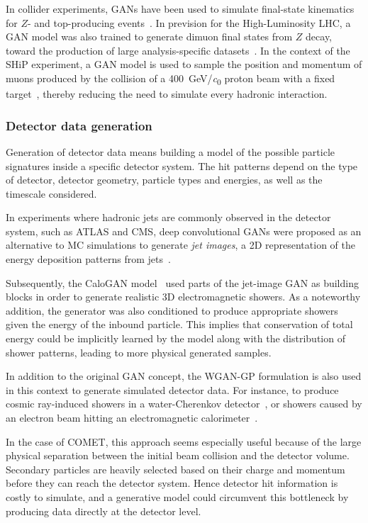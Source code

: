 In collider experiments, GANs have been used to simulate final-state kinematics for $Z$- and top-producing events~\cite{butter_how_2019, otten_event_2019}. 
In prevision for the High-Luminosity LHC, a GAN model was also trained to generate dimuon final states from $Z$ decay, toward the production of large analysis-specific datasets~\cite{hashemi2019lhc}.
In the context of the SHiP experiment, a GAN model is used to sample the position and momentum of muons produced by the collision of a \SI{400}{\GeV/\clight} proton beam with a fixed target~\cite{ahdida_fast_2019}, thereby reducing the need to simulate every hadronic interaction.


\subsubsection{Detector data generation}
Generation of detector data means building a model of the possible particle signatures inside a specific detector system. The hit patterns depend on the type of detector, detector geometry, particle types and energies, as well as the timescale considered.

In experiments where hadronic jets are commonly observed in the detector system, such as ATLAS and CMS, deep convolutional GANs were proposed as an alternative to MC simulations to generate \emph{jet images}, a 2D representation of the energy deposition patterns from jets~\cite{deOliveira2017b}. 

Subsequently, the {\sc CaloGAN} model~\cite{paganini_calogan_2018} used parts of the jet-image GAN as building blocks in order to generate realistic 3D electromagnetic showers. As a noteworthy addition, the generator was also conditioned to produce appropriate showers given the energy of the inbound particle. This implies that conservation of total energy could be implicitly learned by the model along with the distribution of shower patterns, leading to more physical generated samples.


In addition to the original GAN concept, the WGAN-GP formulation is also used in this context to generate simulated detector data. For instance, to produce cosmic ray-induced showers in a water-Cherenkov detector~\cite{Erdmann2018}, or showers caused by an electron beam hitting an electromagnetic calorimeter~\cite{Erdmann2019}.

In the case of COMET, this approach seems especially useful because of the large physical separation between the initial beam collision and the detector volume. Secondary particles are heavily selected based on their charge and momentum before they can reach the detector system. Hence detector hit information is costly to simulate, and a generative model could circumvent this bottleneck by producing data directly at the detector level.

